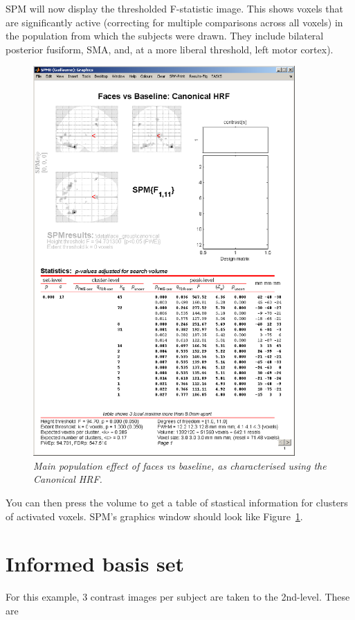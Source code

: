 SPM will now display the thresholded F-statistic image. This shows voxels that are significantly active (correcting for multiple comparisons across all voxels) in the population from which the subjects were drawn. They include bilateral posterior fusiform, SMA, and, at a more liberal threshold, left motor cortex). 
\begin{figure}
\begin{center}
\includegraphics[width=100mm]{faces_group/f1_res}
\caption{\em Main population effect of faces vs baseline, as characterised using the Canonical HRF. \label{f1_res}}
\end{center}
\end{figure}
You can then press the volume to get a table of stastical information for clusters of activated voxels. SPM's graphics window should look like Figure~\ref{f1_res}.

\section{Informed basis set}

For this example, 3 contrast images per subject are taken to the 2nd-level. These are

